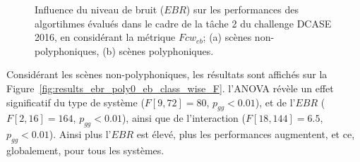 \begin{figure}[t]
        \myfloatalign
        \par
        \par
       \caption[Influence du niveau de bruit ($EBR$) sur les performances des algortihmes évalués dans le cadre de la tâche 2 du challenge DCASE 2016, en considérant la métrique $Fcw_{eb}$]{Influence du niveau de bruit ($EBR$) sur les performances des algortihmes évalués dans le cadre de la tâche 2 du challenge DCASE 2016, en considérant la métrique $Fcw_{eb}$; (a) scènes non-polyphoniques, (b) scènes polyphoniques.}\label{fig:dcase2016_poly1_eb_fc}
\end{figure}

Considérant les scènes non-polyphoniques, les résultats sont affichés sur la Figure~\ref{fig:results_ebr_poly0_eb_class_wise_F}. l'ANOVA révèle un effet significatif du type de système ($F[9,72]=80$, $p_{gg}<0.01$), et de l'$EBR$ ($F[2,16]=164$, $p_{gg}<0.01$), ainsi que de l'interaction ($F[18,144]=6.5$, $p_{gg}<0.01$). Ainsi plus l'$EBR$ est élevé, plus les performances augmentent, et ce, globalement, pour tous les systèmes.

